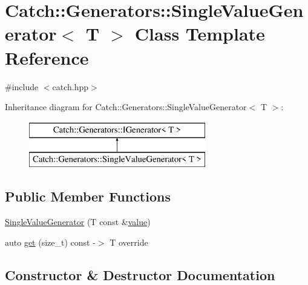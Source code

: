 \hypertarget{class_catch_1_1_generators_1_1_single_value_generator}{}\section{Catch\+:\+:Generators\+:\+:Single\+Value\+Generator$<$ T $>$ Class Template Reference}
\label{class_catch_1_1_generators_1_1_single_value_generator}


{\ttfamily \#include $<$catch.\+hpp$>$}

Inheritance diagram for Catch\+:\+:Generators\+:\+:Single\+Value\+Generator$<$ T $>$\+:\begin{figure}[H]
\begin{center}
\leavevmode
\includegraphics[height=2.000000cm]{class_catch_1_1_generators_1_1_single_value_generator}
\end{center}
\end{figure}
\subsection*{Public Member Functions}
\begin{DoxyCompactItemize}
\item 
\mbox{\hyperlink{class_catch_1_1_generators_1_1_single_value_generator_a4bed2ad14ffe04102d8135e2c82b3ace}{Single\+Value\+Generator}} (T const \&\mbox{\hyperlink{namespace_catch_1_1_generators_a13dbed5ff32f2363862c8ff26661e0ae}{value}})
\item 
auto \mbox{\hyperlink{class_catch_1_1_generators_1_1_single_value_generator_ad03af3fe263136425595bfd2eec84209}{get}} (size\+\_\+t) const -\/$>$ T override
\end{DoxyCompactItemize}


\subsection{Constructor \& Destructor Documentation}
\mbox{\label{class_catch_1_1_generators_1_1_single_value_generator_a4bed2ad14ffe04102d8135e2c82b3ace}} 
